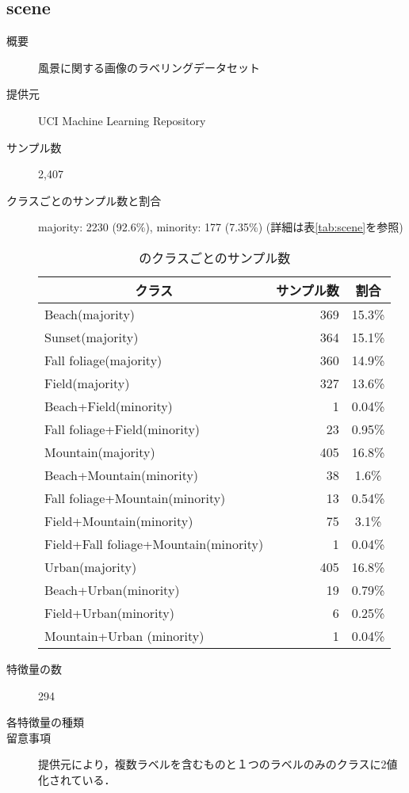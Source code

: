 \subsection{scene}
\begin{description}
    \item[概要] 風景に関する画像のラベリングデータセット
    \cite{scene}
    \item[提供元] UCI Machine Learning Repository
    \item[サンプル数] 2,407
    \item[クラスごとのサンプル数と割合] majority: 2230 (92.6\%), minority: 177 (7.35\%) (詳細は表\ref{tab:scene}を参照)

        \begin{table}[htbp]
            \centering
            \caption{のクラスごとのサンプル数}
            \label{tab:}
            \begin{tabular}{lrc} \hline
                \multicolumn{1}{c}{クラス}&
                \multicolumn{1}{c}{サンプル数}&
                \multicolumn{1}{c}{割合}\\
                \hline
                \hline
                Beach(majority)& 369& 15.3\% \\
                Sunset(majority) &364& 15.1\% \\
                Fall foliage(majority)& 360& 14.9\% \\
                Field(majority) &327& 13.6\% \\
                Beach+Field(minority) &1& 0.04\% \\
                Fall foliage+Field(minority) &23& 0.95\% \\
                Mountain(majority) &405& 16.8\% \\
                Beach+Mountain(minority) &38& 1.6\% \\
                Fall foliage+Mountain(minority) &13& 0.54\% \\
                Field+Mountain(minority)& 75& 3.1\% \\
                Field+Fall foliage+Mountain(minority)& 1& 0.04\% \\
                Urban(majority) &405& 16.8\% \\
                Beach+Urban(minority)	 &19& 0.79\% \\
                Field+Urban(minority)	&6& 0.25\% \\
                Mountain+Urban (minority)&1& 0.04\% \\
                \hline
            \end{tabular}
        \end{table}

    \item[特徴量の数] 294
    \item[各特徴量の種類] \mbox{}
        
    \item[留意事項] 提供元により，複数ラベルを含むものと１つのラベルのみのクラスに2値化されている．
\end{description}

